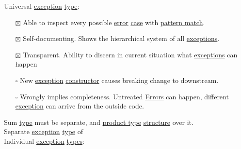 \documentclass[a4paper,14pt,oneside]{book}
\begin{document}
Universal \hyperref[org3882403]{exception} \hyperref[org38dea24]{type}:\\

\begin{itemize}
\item[{$\boxtimes$}] Able to inspect every possible \hyperref[orgdbf9386]{error} \hyperref[orgdf7fd66]{case} with \hyperref[org3f40173]{pattern match}.\\
\item[{$\boxtimes$}] Self-documenting. Shows the hierarchical system of all \hyperref[org99ba80b]{exceptions}.\\
\item[{$\boxtimes$}] Transparent. Ability to discern in current situation what \hyperref[org99ba80b]{exceptions} can happen\\
\item[{$\square$}] New \hyperref[org3882403]{exception} \hyperref[org963e62c]{constructor} causes breaking change to downstream.\\
\item[{$\square$}] Wrongly implies completeness. Untreated \hyperref[org13e4be2]{Errors} can happen, different \hyperref[org3882403]{exception} can arrive from the outside code.\\
\end{itemize}

Sum \hyperref[org38dea24]{type} must be separate, and \hyperref[org18d9d47]{product type} \hyperref[orgcb71b60]{structure} over it.\\
Separate \hyperref[org3882403]{exception} \hyperref[org38dea24]{type} of\\

Individual \hyperref[org3882403]{exception} \hyperref[orgb6d8f90]{types}:\\
\end{document}
